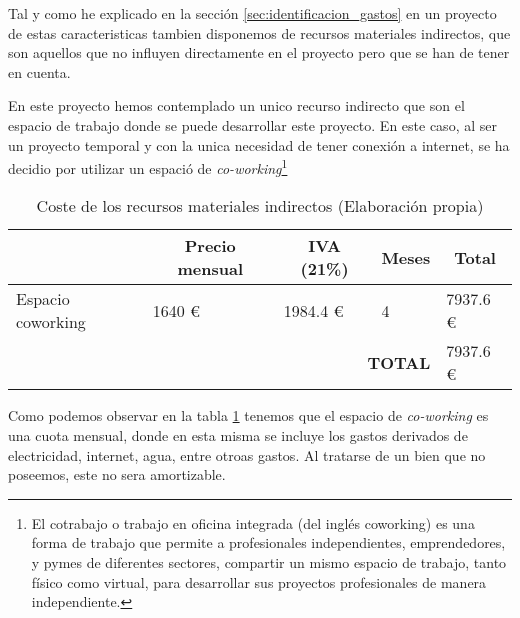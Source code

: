 Tal y como he explicado en la sección \ref{sec:identificacion_gastos} en un proyecto de estas caracteristicas tambien disponemos de recursos materiales indirectos, que son aquellos
que no influyen directamente en el proyecto pero que se han de tener en cuenta. 

En este proyecto hemos contemplado un unico recurso indirecto que son el espacio de trabajo donde se puede desarrollar este proyecto. En este caso, al ser un proyecto 
temporal y con la unica necesidad de tener conexión a internet, se ha decidio por utilizar un espació de \textit{co-working}\footnote{El cotrabajo o trabajo en oficina integrada 
(del inglés coworking) es una forma de trabajo que permite a profesionales independientes, emprendedores, y pymes de diferentes sectores, compartir un mismo espacio de trabajo, 
tanto físico como virtual, para desarrollar sus proyectos profesionales de manera independiente.\cite{CoWorking}}

\begin{table}[H]
    \centering
    \begin{tabular}{llll|l|}
    \cline{2-5}
    \multicolumn{1}{l|}{}                   & \multicolumn{1}{c|}{\cellcolor[HTML]{8EA9D8}\textbf{Precio mensual}} & \multicolumn{1}{c|}{\cellcolor[HTML]{8EA9D8}\textbf{IVA (21\%)}} & \multicolumn{1}{c|}{\cellcolor[HTML]{8EA9D8}\textbf{Meses}} & \multicolumn{1}{c|}{\cellcolor[HTML]{8EA9D8}\textbf{Total}} \\ \hline
    \multicolumn{1}{|l|}{Espacio coworking} & \multicolumn{1}{l|}{1640 €}                                          & \multicolumn{1}{l|}{1984.4 €}                                   & 4                                                           & 7937.6 €                                                    \\ \hline
    \multicolumn{4}{|r|}{\textbf{TOTAL}}                                                                                                                                                                                                           & 7937.6 €                                                    \\ \hline
    \end{tabular}
    \caption{Coste de los recursos materiales indirectos (Elaboración propia)}
    \label{tab:oficina}
\end{table}

Como podemos observar en la tabla \ref{tab:oficina} tenemos que el espacio de \textit{co-working} es una cuota mensual, donde en esta misma se incluye los gastos derivados de
electricidad, internet, agua, entre otroas gastos. Al tratarse de un bien que no poseemos, este no sera amortizable.

